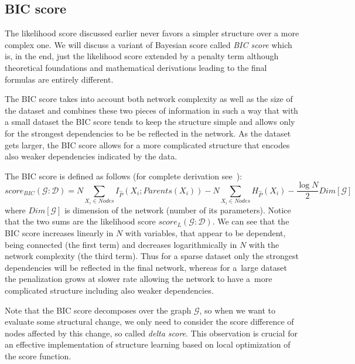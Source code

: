 \documentclass[english,cover]{fitthesis} %
\newcommand{\term}[1]{\emph{#1}}           %
\newcommand{\note}[1]{{\color{green}#1}}
\begin{document}
\subsection{BIC score}
The likelihood score discussed earlier never favors a simpler structure over a more complex one. We will discuss a variant of Bayesian score called \term{BIC score} which is, in the end, just the likelihood score extended by a penalty term although theoretical foundations and mathematical derivations leading to the final formulas are entirely different.


The BIC score takes into account both network complexity as well as the size of the dataset and combines these two pieces of information in such a way that with a small dataset the BIC score tends to keep the structure simple and allows only for the strongest dependencies to be be reflected in the network. As the dataset gets larger, the BIC score allows for a more complicated structure that encodes also weaker dependencies indicated by the data.

The BIC score is defined as follows (for complete derivation see~\cite[p.~794]{pgm}):
\begin{equation}\label{eq:bic_score}
    score_{BIC}(\mathcal{G} : \mathcal{D}) = N \!\!\!\!\!\! \sum_{X_i \in Nodes} \!\!\!\!\!\! I_{\hat P}(X_i;Parents(X_i)) - N \!\!\!\!\!\! \sum_{X_i \in Nodes} \!\!\!\!\!\! H_{\hat P}(X_i) - \frac{\log N}{2} Dim[\mathcal{G}]
\end{equation}
where $Dim[\mathcal{G}]$ is dimension of the network (number of its parameters). Notice that the two sums are the likelihood score $score_{L}(\mathcal{G} : \mathcal{D})$. We can see that the BIC score increases linearly in $N$ with variables, that appear to be dependent, being connected (the first term) and decreases logarithmically in $N$ with the network complexity (the third term). Thus for a sparse dataset only the strongest dependencies will be reflected in the final network, whereas for a~large dataset the penalization grows at slower rate allowing the network to have a~more complicated structure including also weaker dependencies.

Note that the BIC score decomposes over the graph $\mathcal{G}$, so when we want to evaluate some structural change, we only need to consider the score difference of nodes affected by this change, so called \term{delta score}. This observation is crucial for an effective implementation of structure learning based on local optimization of the score function. 
\end{document}
